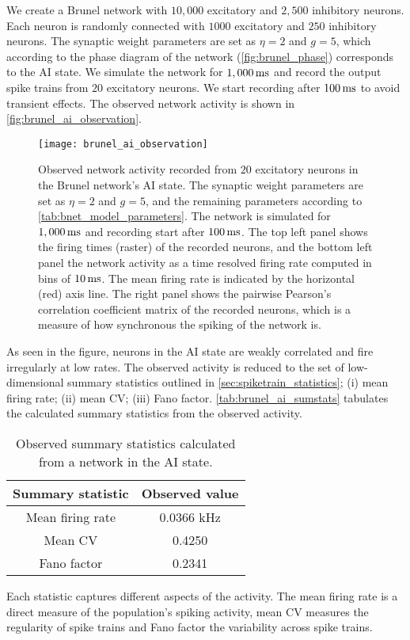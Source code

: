 We create a Brunel network with $10,000$ excitatory and $2,500$ inhibitory neurons. Each neuron is randomly connected with $1000$ excitatory and $250$ inhibitory neurons. The synaptic weight parameters are set as $\eta=2$ and $g=5$, which according to the phase diagram of the network (\autoref{fig:brunel_phase}) corresponds to the AI state. We simulate the network for $1,000 \,\mathrm{ms}$ and record the output spike trains from $20$ excitatory neurons. We start recording after $100 \,\mathrm{ms}$ to avoid transient effects. The observed network activity is shown in \autoref{fig:brunel_ai_observation}.
\begin{figure}[!htb]
    \centering
    \texttt{[image: brunel\_ai\_observation]}
    \caption{Observed network activity recorded from $20$ excitatory neurons in the Brunel network's AI state. The synaptic weight parameters are set as $\eta=2$ and $g=5$, and the remaining parameters according to \autoref{tab:bnet_model_parameters}. The network is simulated for  $1,000 \,\mathrm{ms}$ and recording start after $100 \,\mathrm{ms}$. The top left panel shows the firing times (raster) of the recorded neurons, and the bottom left panel the network activity as a time resolved firing rate computed in bins of $10 \,\mathrm{ms}$. The mean firing rate is indicated by the horizontal (red) axis line. The right panel shows the pairwise Pearson's correlation coefficient matrix of the recorded neurons, which is a measure of how synchronous the spiking of the network is. 
    }
    \label{fig:brunel_ai_observation}
\end{figure}
As seen in the figure, neurons in the AI state are weakly correlated and fire irregularly at low rates. The observed activity is reduced to the set of low-dimensional summary statistics outlined in \cref{sec:spiketrain_statistics}; (i) mean firing rate; (ii) mean CV; (iii) Fano factor. \autoref{tab:brunel_ai_sumstats} tabulates the calculated summary statistics from the observed activity.
\begin{table}[!htb]
  \caption{Observed summary statistics calculated from a network in the AI state.}
  \begin{center}
    \begin{tabular}{cc}
      \toprule
      \textbf{Summary statistic} & \textbf{Observed value} \\
      \midrule
      Mean firing rate &  0.0366 kHz \\
      Mean CV &  0.4250  \\
      Fano factor & 0.2341  \\
      \bottomrule
    \end{tabular}
  \end{center}
  \label{tab:brunel_ai_sumstats}
\end{table}
Each statistic captures different aspects of the activity. The mean firing rate is a direct measure of the population's spiking activity, mean CV measures the regularity of spike trains and Fano factor the variability across spike trains. 

